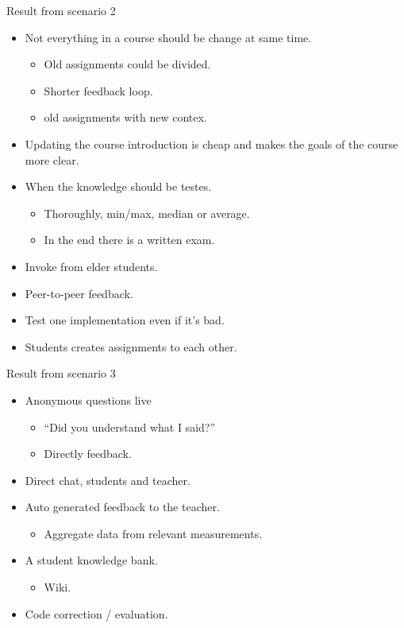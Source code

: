 Result from scenario 2
\begin{itemize}
\item Not everything in a course should be change at same time.
\begin{itemize}
\item Old assignments could be divided.
\item Shorter feedback loop.
\item old assignments with new contex.
\end{itemize}
\item Updating the course introduction is cheap and makes the goals of the course more clear.
\item When the knowledge should be testes.
\begin{itemize}
\item Thoroughly, min/max, median or average.
\item In the end there is a written exam.
\end{itemize}
\item Invoke from elder students.
\item Peer-to-peer feedback.
\item Test one implementation even if it's bad.
\item Students creates assignments to each other.
\end{itemize}

Result from scenario 3
\begin{itemize}
\item Anonymous questions live
\begin{itemize}
\item ``Did you understand what I said?''
\item Directly feedback.
\end{itemize}
\item Direct chat, students and teacher.
\item Auto generated feedback to the teacher.
\begin{itemize}
\item Aggregate data from relevant measurements.
\end{itemize}
\item A student knowledge bank.
\begin{itemize}
\item Wiki.
\end{itemize}
\item Code correction / evaluation.
\end{itemize}


